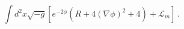 \begin{equation}
\int d^2x \sqrt{-g} \left[ e^{-2\phi} (R + 4 (\nabla \phi)^2 + 4)
+ \mathcal{L}_m \right]\, .
\end{equation}

